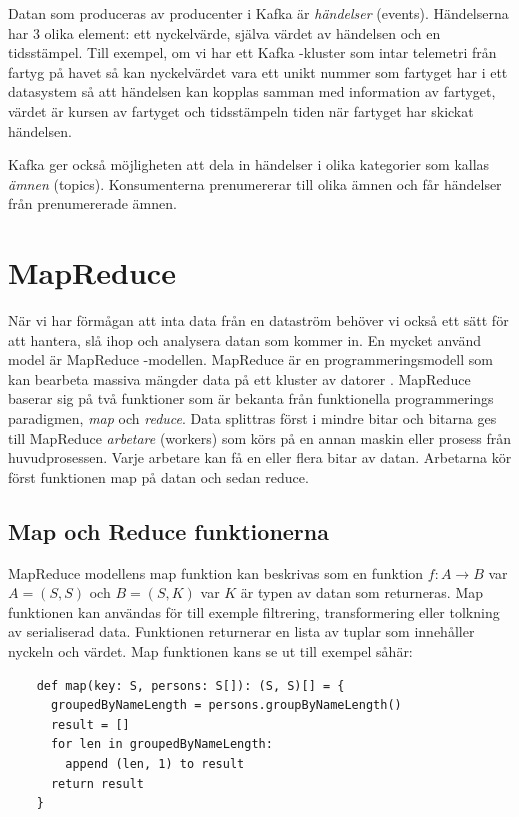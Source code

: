 Datan som produceras av producenter i Kafka är \textit{händelser} (events). Händelserna har 3 olika
element: ett nyckelvärde, själva värdet av händelsen och en tidsstämpel. Till exempel, om vi har ett Kafka -kluster som intar telemetri från fartyg på havet så kan nyckelvärdet vara ett unikt nummer som fartyget har i ett datasystem så att händelsen kan kopplas samman med information av fartyget, värdet är kursen av fartyget och tidsstämpeln tiden när fartyget har skickat händelsen.

Kafka ger också möjligheten att dela in händelser i olika kategorier som kallas \textit{ämnen} (topics). Konsumenterna prenumererar till olika ämnen och får händelser från prenumererade ämnen.

\section{MapReduce}

När vi har förmågan att inta data från en dataström behöver vi också ett sätt för att hantera, slå ihop och analysera datan som kommer in. En mycket använd model är MapReduce -modellen. MapReduce är en programmeringsmodell som kan bearbeta massiva mängder data på ett kluster av datorer \citep{dean2008mapreduce}. MapReduce baserar sig på två funktioner 
som är bekanta från funktionella programmerings paradigmen, \textit{map} och \textit{reduce}. Data splittras först i mindre bitar och bitarna ges till MapReduce \textit{arbetare} (workers) som körs på en annan maskin eller prosess från huvudprosessen. Varje arbetare
kan få en eller flera bitar av datan. Arbetarna kör först funktionen map på datan och sedan reduce.

\subsection{Map och Reduce funktionerna}

MapReduce modellens map funktion kan beskrivas som en funktion $f: A \rightarrow B$ var $A = (S, S)$ och $B = (S, K)$ var $K$ är typen av datan som returneras. Map funktionen kan användas för till exemple filtrering,
transformering eller tolkning av serialiserad data. Funktionen returnerar en lista av tuplar som innehåller nyckeln och värdet. Map funktionen kans se ut till exempel såhär:

\begin{verbatim}
    def map(key: S, persons: S[]): (S, S)[] = {
      groupedByNameLength = persons.groupByNameLength()
      result = []
      for len in groupedByNameLength:
        append (len, 1) to result
      return result
    }
\end{verbatim}

